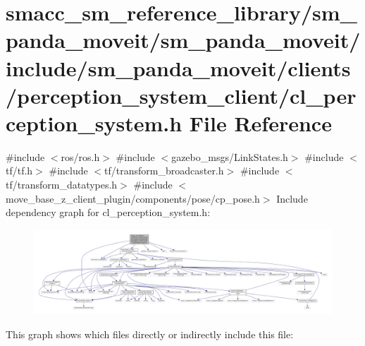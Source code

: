 \hypertarget{sm__panda__moveit_2sm__panda__moveit_2include_2sm__panda__moveit_2clients_2perception__system__cc1c9530385af1e47b0b506464d2e9fea}{}\section{smacc\+\_\+sm\+\_\+reference\+\_\+library/sm\+\_\+panda\+\_\+moveit/sm\+\_\+panda\+\_\+moveit/include/sm\+\_\+panda\+\_\+moveit/clients/perception\+\_\+system\+\_\+client/cl\+\_\+perception\+\_\+system.h File Reference}
\label{sm__panda__moveit_2sm__panda__moveit_2include_2sm__panda__moveit_2clients_2perception__system__cc1c9530385af1e47b0b506464d2e9fea}
{\ttfamily \#include $<$ros/ros.\+h$>$}\newline
{\ttfamily \#include $<$gazebo\+\_\+msgs/\+Link\+States.\+h$>$}\newline
{\ttfamily \#include $<$tf/tf.\+h$>$}\newline
{\ttfamily \#include $<$tf/transform\+\_\+broadcaster.\+h$>$}\newline
{\ttfamily \#include $<$tf/transform\+\_\+datatypes.\+h$>$}\newline
{\ttfamily \#include $<$move\+\_\+base\+\_\+z\+\_\+client\+\_\+plugin/components/pose/cp\+\_\+pose.\+h$>$}\newline
Include dependency graph for cl\+\_\+perception\+\_\+system.\+h\+:
\nopagebreak
\begin{figure}[H]
\begin{center}
\leavevmode
\includegraphics[width=350pt]{sm__panda__moveit_2sm__panda__moveit_2include_2sm__panda__moveit_2clients_2perception__system__ca5a52a4eb6256b18fd58cf9bd35eb4b2}
\end{center}
\end{figure}
This graph shows which files directly or indirectly include this file\+:
